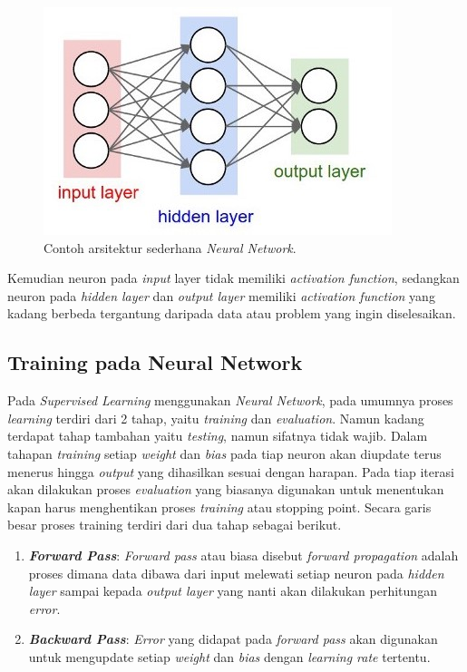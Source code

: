 \begin{figure} [!h] \centering
	\includegraphics[scale=0.7]{img/ann_arch.jpeg}
	\caption{Contoh arsitektur sederhana \textit{Neural Network}.}
	\label{fig:ann_arch}
\end{figure}

Kemudian neuron pada \textit{input} layer tidak memiliki \textit{activation function}, sedangkan neuron pada \textit{hidden layer} dan \textit{output layer} memiliki \textit{activation function} yang kadang berbeda tergantung daripada data atau problem yang ingin diselesaikan.
\vspace{1ex}

\subsection{Training pada Neural Network}
\label{sec:sub_sec2_nn_train}

Pada \textit{Supervised Learning} menggunakan \textit{Neural Network}, pada umumnya proses \textit{learning} terdiri dari 2 tahap, yaitu \textit{training} dan \textit{evaluation}. Namun kadang terdapat tahap tambahan yaitu \textit{testing}, namun sifatnya tidak wajib. Dalam tahapan \textit{training} setiap \textit{weight} dan \textit{bias} pada tiap neuron akan diupdate terus menerus hingga \textit{output} yang dihasilkan sesuai dengan harapan. Pada tiap iterasi akan dilakukan proses \textit{evaluation} yang biasanya digunakan untuk menentukan kapan harus menghentikan proses \textit{training} atau stopping point. Secara garis besar proses training terdiri dari dua tahap sebagai berikut.

\begin{enumerate}[label=\textbf{\alph*.}]
	\item \textbf{\textit{Forward Pass}}: \textit{Forward pass} atau biasa disebut \textit{forward propagation} adalah proses dimana data dibawa dari input melewati setiap neuron pada \textit{hidden layer} sampai kepada \textit{output layer} yang nanti akan dilakukan perhitungan \textit{error}.
	\
	\item \textbf{\textit{Backward Pass}}: \textit{Error} yang didapat pada \textit{forward pass} akan digunakan untuk mengupdate setiap \textit{weight} dan \textit{bias} dengan \textit{learning rate} tertentu.
\end{enumerate}

